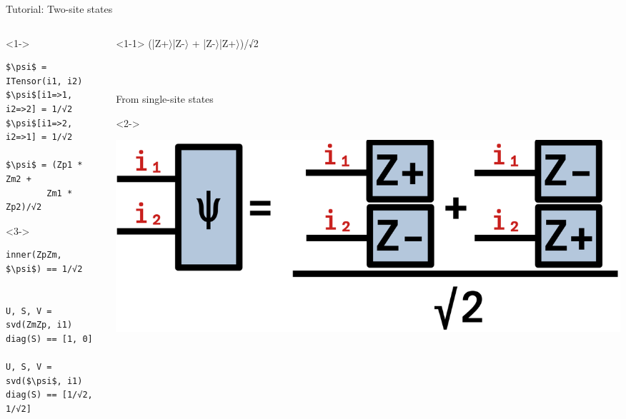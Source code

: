 \begin{frame}[fragile]{Tutorial: Two-site states}

\begin{columns}

\begin{column}{5cm}

\begin{onlyenv}<1->
\begin{lstlisting}[language=JuliaLocal, style=julia, mathescape, basicstyle=\scriptsize\ttfamily]
$\psi$ = ITensor(i1, i2)
$\psi$[i1=>1, i2=>2] = 1/√2
$\psi$[i1=>2, i2=>1] = 1/√2

$\psi$ = (Zp1 * Zm2 +
        Zm1 * Zp2)/√2
\end{lstlisting}
\end{onlyenv}

\begin{onlyenv}<3->
\begin{lstlisting}[language=JuliaLocal, style=julia, mathescape, basicstyle=\scriptsize\ttfamily]
inner(ZpZm, $\psi$) == 1/√2


U, S, V = svd(ZmZp, i1)
diag(S) == [1, 0]

U, S, V = svd($\psi$, i1)
diag(S) == [1/√2, 1/√2]
\end{lstlisting}
\end{onlyenv}

\end{column}

\begin{column}{5cm}

\begin{onlyenv}<1-1>
(|Z+$\rangle$|Z-$\rangle$ + |Z-$\rangle$|Z+$\rangle$)/√2 \\
~\\
~\\
~\\
From single-site states \\
\end{onlyenv}

\begin{onlyenv}<2->
\vspace*{0.0cm}
\begin{center}
\includegraphics[width=1.0\textwidth]{
  slides/assets/cat12.png
}
\end{center}
\vspace*{0.0cm}
\end{onlyenv}


\end{column}
\end{columns}
\end{frame}
